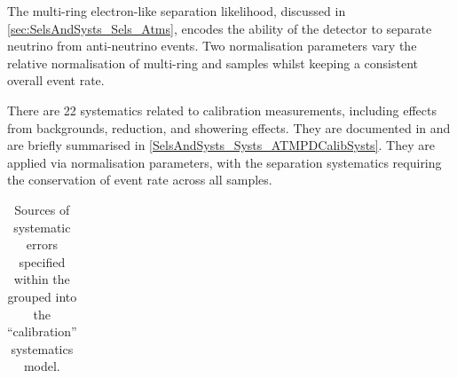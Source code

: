 The multi-ring electron-like separation likelihood, discussed in \autoref{sec:SelsAndSysts_Sels_Atms}, encodes the ability of the detector to separate neutrino from anti-neutrino events. Two normalisation parameters vary the relative normalisation of multi-ring  and  samples whilst keeping a consistent overall event rate.

There are 22 systematics related to calibration measurements, including effects from backgrounds, reduction, and showering effects. They are documented in \cite{Jiang2019-iw} and are briefly summarised in \autoref{SelsAndSysts_Systs_ATMPDCalibSysts}. They are applied via normalisation parameters, with the separation systematics requiring the conservation of event rate across all samples.

\begin{table}[ht!]
  \centering
  \caption{Sources of systematic errors specified within the grouped into the ``calibration'' systematics model.}
  \label{SelsAndSysts_Systs_ATMPDCalibSysts}
		
  \begin{tabular}{ll} 
    

\end{tabular}
\end{table}
